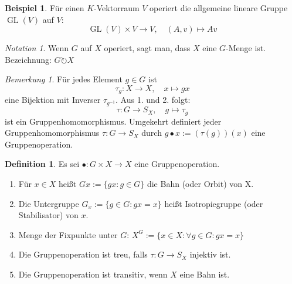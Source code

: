 \documentclass[12pt]{scrartcl} %
\DeclareMathOperator{\GL}{GL}
\theoremstyle{definition}
\newtheorem*{defn}{Definition}
\newtheorem{ex}{Beispiel}
\theoremstyle{remark}
\newtheorem*{notation}{Notation}
\newtheorem*{nb}{Bemerkung}
\begin{document}
\begin{ex}
	Für einen $K$-Vektorraum \(V\) operiert die allgemeine lineare Gruppe $\GL(V)$ auf $V$:
	$$\GL(V) \times V \to V, \quad (A,v) \mapsto Av$$
\end{ex}

\begin{notation}
	Wenn $G$ auf $X$ operiert, sagt man, dass $X$ eine $G$-Menge ist.
	Bezeichnung: $G\circlearrowright X$
\end{notation}

\begin{nb}
	Für jedes Element $g\in G$ ist $$\tau_g: X \rightarrow X, \quad x \mapsto gx$$ eine Bijektion mit Inverser $\tau_{g^{-1}}$.
	Aus 1. und 2. folgt:
	$$\tau: G \rightarrow S_X, \quad g \mapsto \tau_g$$ ist ein Gruppenhomomorphismus.
	Umgekehrt definiert jeder Gruppenhomomorphismus $\tau: G \rightarrow S_X$ durch $g \bullet x := (\tau(g))(x)$ eine Gruppenoperation.
\end{nb}
	
\begin{defn} Es sei $\bullet: G \times X \to X$ eine Gruppenoperation.
	\begin{enumerate}
	\item Für $x\in X$ heißt $Gx := \{gx : g \in G\}$ die Bahn (oder Orbit) von X. 
	\item Die Untergruppe $G_x:= \{g\in G : gx=x\}$ heißt Isotropiegruppe (oder Stabilisator) von $x$.
	\item Menge der Fixpunkte unter $G$: $X^G := \{x \in X : \forall g \in G: gx=x\}$
	\item Die Gruppenoperation ist treu, falls $\tau:G \rightarrow S_X$ injektiv ist.
	\item Die Gruppenoperation ist transitiv, wenn $X$ eine Bahn ist.
	\end{enumerate}
\end{defn}
	
\end{document}
